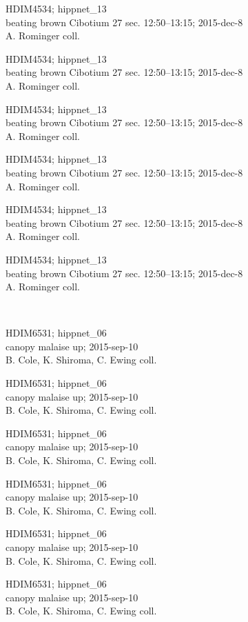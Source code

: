 \documentclass[2pt]{extarticle}
\begin{document}
\noindent
\parbox{0.16\textwidth}{\tiny \raggedright \rule[-0.3\baselineskip]{0pt}{10pt}HDIM4534; hippnet\_13\\ beating brown Cibotium 27 sec. 12:50--13:15; 2015-dec-8\\ A. Rominger coll.}
\parbox{0.16\textwidth}{\tiny \raggedright \rule[-0.3\baselineskip]{0pt}{10pt}HDIM4534; hippnet\_13\\ beating brown Cibotium 27 sec. 12:50--13:15; 2015-dec-8\\ A. Rominger coll.}
\parbox{0.16\textwidth}{\tiny \raggedright \rule[-0.3\baselineskip]{0pt}{10pt}HDIM4534; hippnet\_13\\ beating brown Cibotium 27 sec. 12:50--13:15; 2015-dec-8\\ A. Rominger coll.}
\parbox{0.16\textwidth}{\tiny \raggedright \rule[-0.3\baselineskip]{0pt}{10pt}HDIM4534; hippnet\_13\\ beating brown Cibotium 27 sec. 12:50--13:15; 2015-dec-8\\ A. Rominger coll.}
\parbox{0.16\textwidth}{\tiny \raggedright \rule[-0.3\baselineskip]{0pt}{10pt}HDIM4534; hippnet\_13\\ beating brown Cibotium 27 sec. 12:50--13:15; 2015-dec-8\\ A. Rominger coll.}
\parbox{0.16\textwidth}{\tiny \raggedright \rule[-0.3\baselineskip]{0pt}{10pt}HDIM4534; hippnet\_13\\ beating brown Cibotium 27 sec. 12:50--13:15; 2015-dec-8\\ A. Rominger coll.} \\ 
\vspace{0.001in} 

\noindent
\parbox{0.16\textwidth}{\tiny \raggedright \rule[-0.3\baselineskip]{0pt}{10pt}HDIM6531; hippnet\_06\\ canopy malaise up; 2015-sep-10\\ B. Cole, K. Shiroma, C. Ewing coll.}
\parbox{0.16\textwidth}{\tiny \raggedright \rule[-0.3\baselineskip]{0pt}{10pt}HDIM6531; hippnet\_06\\ canopy malaise up; 2015-sep-10\\ B. Cole, K. Shiroma, C. Ewing coll.}
\parbox{0.16\textwidth}{\tiny \raggedright \rule[-0.3\baselineskip]{0pt}{10pt}HDIM6531; hippnet\_06\\ canopy malaise up; 2015-sep-10\\ B. Cole, K. Shiroma, C. Ewing coll.}
\parbox{0.16\textwidth}{\tiny \raggedright \rule[-0.3\baselineskip]{0pt}{10pt}HDIM6531; hippnet\_06\\ canopy malaise up; 2015-sep-10\\ B. Cole, K. Shiroma, C. Ewing coll.}
\parbox{0.16\textwidth}{\tiny \raggedright \rule[-0.3\baselineskip]{0pt}{10pt}HDIM6531; hippnet\_06\\ canopy malaise up; 2015-sep-10\\ B. Cole, K. Shiroma, C. Ewing coll.}
\parbox{0.16\textwidth}{\tiny \raggedright \rule[-0.3\baselineskip]{0pt}{10pt}HDIM6531; hippnet\_06\\ canopy malaise up; 2015-sep-10\\ B. Cole, K. Shiroma, C. Ewing coll.} \\ 
\vspace{0.001in} 
\end{document}
